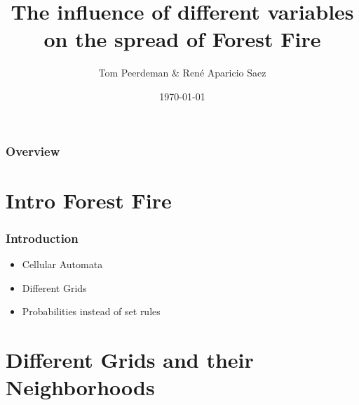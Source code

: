 \documentclass{beamer}
\title[Spread of Forest Fire]{The influence of different variables on the spread of Forest Fire} %
\author{Tom Peerdeman \& Ren\'e Aparicio Saez} %
\date{\today} %
\begin{document}
\begin{frame}
\titlepage %
\end{frame}

\begin{frame}
\frametitle{Overview} %
\tableofcontents %
\end{frame}


\section{Intro Forest Fire} 

\begin{frame}
\frametitle{Introduction}
\begin{itemize}
\item{Cellular Automata}
\item{Different Grids}
\item{Probabilities instead of set rules}
\end{itemize}
\end{frame}

\section{Different Grids and their Neighborhoods} 
\end{document}
